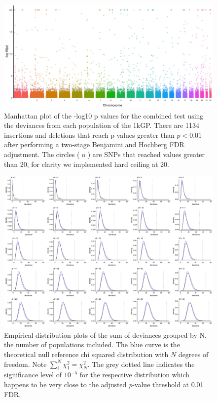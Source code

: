 \documentclass[9pt,lineno]{elife}
\begin{document}
\begin{figure}
\includegraphics[width=\hsize,keepaspectratio]{./Figures/ManhattanPlot_indels.jpg}

\caption{Manhattan plot of the -log10 p values for the combined test using the deviances from each population of the 1kGP. 
There are 1134 insertions and deletions that reach p values greater than $ p < 0.01$ after performing a two-stage Benjamini and Hochberg FDR adjustment. 
The circles ( o ) are SNPs that reached values greater than 20, for clarity we implemented hard ceiling at 20.}
  \label{indels_Manhattan}
\end{figure}

\begin{figure}
\includegraphics[width=\hsize,keepaspectratio]{./Figures/AllDeviances.jpg}

\caption{Empirical distribution plots of the sum of deviances grouped by N, the number of populations included. The blue curve is the theoretical null reference chi squared distribution with $N$ degrees of freedom. Note $\sum_i^N  \chi^2_1= \chi^2_N$. The grey dotted line indicates the significance level of $10^{-5}$ for the respective distribution which happens to be very close to the adjusted \textit{p}-value threshold at 0.01 FDR. }
\label{Deviances}
\end{figure}
\end{document}
